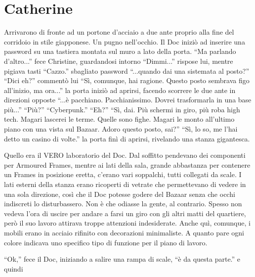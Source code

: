   \section*{Catherine}

    Arrivarono di fronte ad un portone d'acciaio a due ante proprio alla fine del corridoio in stile giapponese. Un
    pugno nell'occhio. Il Doc iniziò ad inserire una password su una tastiera montata sul muro a lato della porta.
    ``Ma parlando d'altro...'' fece Christine, guardandosi intorno ``Dimmi...'' rispose lui, mentre pigiava tasti
    ``Cazzo.'' sbagliato password ``...quando dai una sistemata al posto?'' ``Dici eh?'' commentò lui ``Sì, comunque,
    hai ragione. Questo posto sembrava figo all'inizio, ma ora...'' la porta iniziò ad aprirsi, facendo scorrere le due
    ante in direzioni opposte ``...è pacchiano. Pacchianissimo. Dovrei trasformarla in una base più...'' ``Più?''
    ``Cyberpunk.'' ``Eh?'' ``Sì, dai. Più schermi in giro, più roba high tech. Magari lascerei le terme. Quelle sono
    fighe. Magari le monto all'ultimo piano con una vista sul Bazaar. Adoro questo posto, sai?'' ``Sì, lo so, me l'hai
    detto un casino di volte.'' la porta finì di aprirsi, rivelando una stanza gigantesca.

    Quello era il VERO laboratorio del Doc. Dal soffitto pendevano dei componenti per Armoured Frames, mentre ai lati
    della sala, grande abbastanza per contenere un Frames in posizione eretta, c'erano vari soppalchi, tutti collegati
    da scale. I lati esterni della stanza erano ricoperti di vetrate che permettevano di vedere in una sola direzione,
    così che il Doc potesse godere del Bazaar senza che occhi indiscreti lo disturbassero. Non è che odiasse la gente,
    al contrario. Spesso non vedeva l'ora di uscire per andare a farsi un giro con gli altri matti del quartiere, però
    il suo lavoro attirava troppe attenzioni indesiderate. Anche quì, comunque, i mobili erano in acciaio rifinito con
    decorazioni minimaliste. A quanto pare ogni colore indicava uno specifico tipo di funzione per il piano di lavoro.

    ``Ok,'' fece il Doc, iniziando a salire una rampa di scale, ``è da questa parte.'' e quindi
